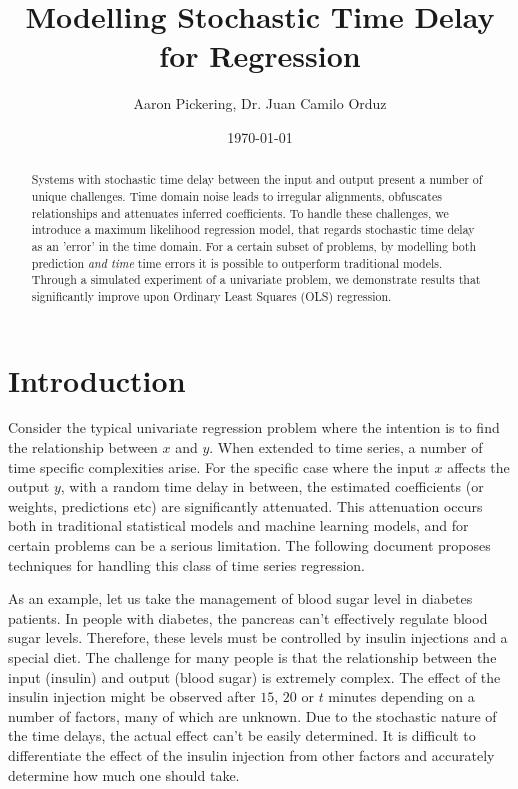 \documentclass[11pt]{amsart}
\begin{document}
\title{Modelling Stochastic Time Delay for Regression}
\author{Aaron Pickering, Dr. Juan Camilo Orduz}
\date{\today}
\maketitle

\begin{abstract}
Systems with stochastic time delay between the input and output present a number of unique challenges. 
Time domain noise leads to irregular alignments, obfuscates relationships and attenuates inferred coefficients. 
To handle these challenges, we introduce a maximum likelihood regression model, that regards stochastic time delay as an 'error' in the time domain. For a certain subset of problems, by modelling both prediction \emph{and time} time errors it is possible to outperform traditional models.
Through a simulated experiment of a univariate problem, we demonstrate results that significantly improve upon Ordinary Least Squares (OLS) regression.
\end{abstract}

\section{Introduction}

Consider the typical univariate regression problem where the intention is to find the relationship between $x$ and $y$. When extended to time series, a number of time specific complexities arise. For the specific case where the input $x$ affects the output $y$, with a random time delay in between, the estimated coefficients (or weights, predictions etc) are significantly attenuated. This attenuation occurs both in traditional statistical models and machine learning models, and for certain problems can be a serious limitation. The following document proposes techniques for handling this class of time series regression.

As an example, let us take the management of blood sugar level in diabetes patients. In people with diabetes, the pancreas can't effectively regulate blood sugar levels. Therefore, these levels must be controlled by insulin injections and a special diet. The challenge for many people is that the relationship between the input (insulin) and output (blood sugar) is extremely complex. The effect of the insulin injection might be observed after $15$, $20$  or $t$ minutes depending on a number of factors, many of which are unknown. Due to the stochastic nature of the time delays, the actual effect can't be easily determined. It is difficult to differentiate the effect of the insulin injection from other factors and accurately determine how much one should take.
\end{document}
